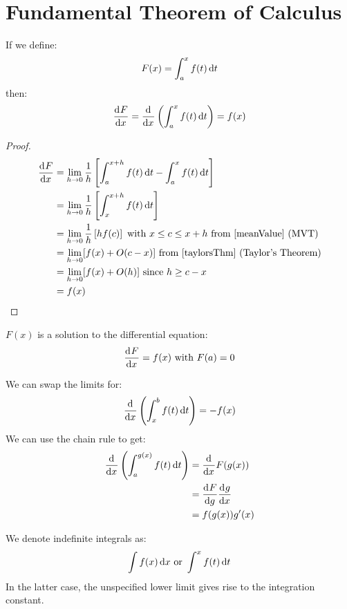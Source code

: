\documentclass[../main.tex]{subfiles}
\begin{document}
\section{Fundamental Theorem of Calculus}
\begin{theorem}
  \label{FTC}
  If we define:
  \[
    F(x) = \int_{a}^{x} f(t) \d{t}
  \]
  then:
  \[
    \deriv{F}{x} = \deriv{}{x}\left(\int_{a}^{x} f(t) \d{t}\right) = f(x)
  \]
\end{theorem}
\begin{proof}
  \begin{align*}
    \deriv{F}{x} &= \lim_{h \to 0} \frac{1}{h} \left[\int_{a}^{x+h} f(t) \d{t} - \int_{a}^{x} f(t) \d{t}\right] \\
                 &= \lim_{h \to 0} \frac{1}{h} \left[\int_{x}^{x+h} f(t) \d{t}\right] \\
                 &= \lim_{h \to 0} \frac{1}{h} \left[hf(c)\right] \text{ with } x \leq c \leq x + h \text{ from \cref{meanValue} (MVT)} \\
                 &= \lim_{h \to 0} [f(x) + O(c-x)] \text{ from \cref{taylorsThm} (Taylor's Theorem)} \\
                 &=\lim_{h \to 0} [f(x) + O(h)] \text{ since $h \geq c-x$} \\
                 &= f(x)
  \end{align*}
\end{proof}
\begin{remark}[Note]
  $F(x)$ is a solution to the differential equation:
  \[
    \deriv{F}{x} = f(x) \text{ with } F(a) = 0
  \]
\end{remark}
\begin{corollary}
  We can swap the limits for:
  \[
    \deriv{}{x}\left(\int_{x}^{b} f(t) \d{t}\right) = -f(x)
  \]
  We can use the chain rule to get:
  \begin{align*}
    \deriv{}{x}\left(\int_{a}^{g(x)} f(t) \d{t}\right) &= \deriv{}{x}F(g(x)) \\
                                            &= \deriv{F}{g} \deriv{g}{x} \\
                                            &= f(g(x)) g'(x)
  \end{align*}
\end{corollary}
\begin{remark}[Notation]
  We denote indefinite integrals as:
  \[
    \int f(x) \d{x} \text{ or } \int_{}^{x} f(t) \d{t}
  \]
  In the latter case, the unspecified lower limit gives rise to the integration constant.
\end{remark}
\end{document}
